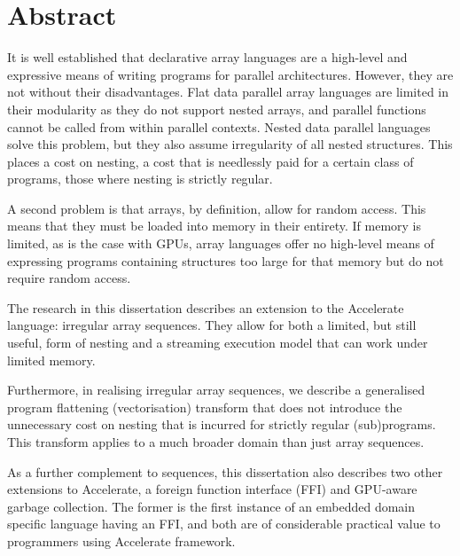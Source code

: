 \chapter{Abstract}


It is well established that declarative array languages are a high-level and expressive means of writing programs for parallel architectures. However, they are not without their disadvantages. Flat data parallel array languages are limited in their modularity as they do not support nested arrays, and parallel functions cannot be called from within parallel contexts. Nested data parallel languages solve this problem, but they also assume irregularity of all nested structures. This places a cost on nesting, a cost that is needlessly paid for a certain class of programs, those where nesting is strictly regular.

A second problem is that arrays, by definition, allow for random access. This means that they must be loaded into memory in their entirety. If memory is limited, as is the case with GPUs, array languages offer no high-level means of expressing programs containing structures too large for that memory but do not require random access.

The research in this dissertation describes an extension to the Accelerate language: irregular array sequences. They allow for both a limited, but still useful, form of nesting and a streaming execution model that can work under limited memory.

Furthermore, in realising irregular array sequences, we describe a generalised program flattening (vectorisation) transform that does not introduce the unnecessary cost on nesting that is incurred for strictly regular (sub)programs. This transform applies to a much broader domain than just array sequences.

As a further complement to sequences, this dissertation also describes two other extensions to Accelerate, a foreign function interface (FFI) and GPU-aware garbage collection. The former is the first instance of an embedded domain specific language having an FFI, and both are of considerable practical value to programmers using Accelerate framework.
